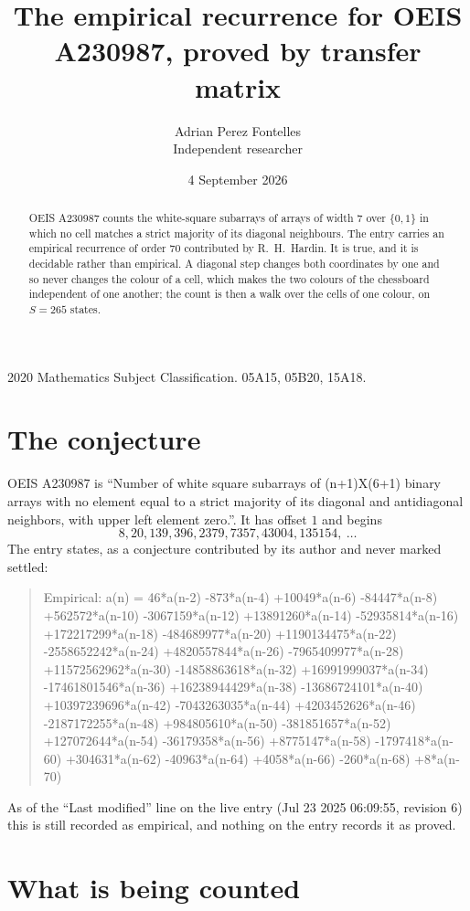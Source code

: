 \documentclass[11pt,a4paper]{article}
\title{The empirical recurrence for OEIS A230987, proved by transfer matrix}
\author{Adrian Perez Fontelles\\ \small Independent researcher}
\date{4 September 2026}
\theoremstyle{plain}
\theoremstyle{definition}
\begin{document}
\maketitle

\begin{abstract}
OEIS A230987 counts the white-square subarrays of arrays of width $7$ over $\{0,1\}$ in which
no cell matches a strict majority of its diagonal neighbours. The entry carries an empirical recurrence of order $70$ contributed by
R.~H.~Hardin. It is true, and it is decidable rather than empirical. A diagonal step changes
both coordinates by one and so never changes the colour of a cell, which makes the two colours
of the chessboard independent of one another; the count is then a walk over the cells of one
colour, on $S=265$ states.
\end{abstract}

\noindent\small 2020 Mathematics Subject Classification. 05A15, 05B20, 15A18.\normalsize

\section{The conjecture}

OEIS A230987 is ``Number of white square subarrays of (n+1)X(6+1) binary arrays with no element equal to a strict majority of its diagonal and antidiagonal neighbors, with upper left element zero.''. It has offset $1$ and begins
\[
8, 20, 139, 396, 2379, 7357, 43004, 135154,\ \dots
\]
The entry states, as a conjecture contributed by its author and never marked settled:
\begin{quote}
Empirical: a(n) = 46*a(n-2) -873*a(n-4) +10049*a(n-6) -84447*a(n-8) +562572*a(n-10) -3067159*a(n-12) +13891260*a(n-14) -52935814*a(n-16) +172217299*a(n-18) -484689977*a(n-20) +1190134475*a(n-22) -2558652242*a(n-24) +4820557844*a(n-26) -7965409977*a(n-28) +11572562962*a(n-30) -14858863618*a(n-32) +16991999037*a(n-34) -17461801546*a(n-36) +16238944429*a(n-38) -13686724101*a(n-40) +10397239696*a(n-42) -7043263035*a(n-44) +4203452626*a(n-46) -2187172255*a(n-48) +984805610*a(n-50) -381851657*a(n-52) +127072644*a(n-54) -36179358*a(n-56) +8775147*a(n-58) -1797418*a(n-60) +304631*a(n-62) -40963*a(n-64) +4058*a(n-66) -260*a(n-68) +8*a(n-70)
\end{quote}
As of the ``Last modified'' line on the live entry (Jul 23 2025 06:09:55, revision 6) this is still
recorded as empirical, and nothing on the entry records it as proved.

\section{What is being counted}
\end{document}
